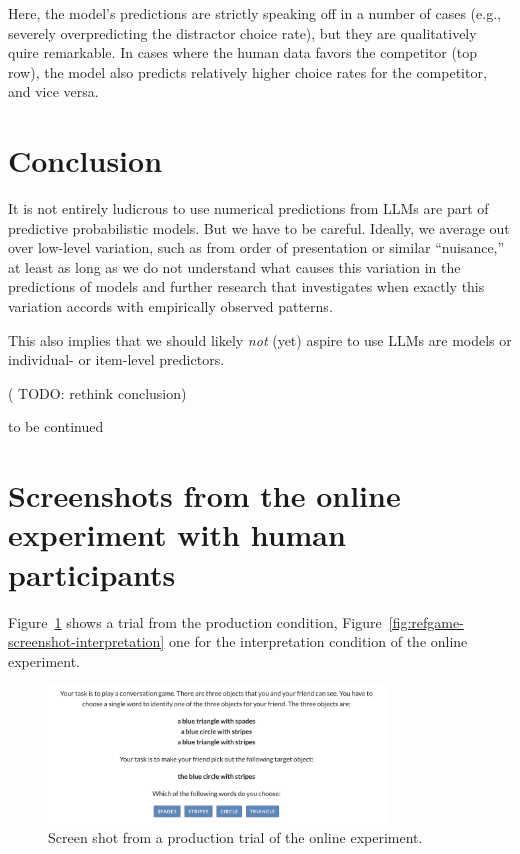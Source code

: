 \documentclass{article}
\begin{document}
Here, the model's predictions are strictly speaking off in a number of
cases (e.g., severely overpredicting the distractor choice rate), but
they are qualitatively quire remarkable. In cases where the human data
favors the competitor (top row), the model also predicts relatively
higher choice rates for the competitor, and vice versa.

\hypertarget{conclusion}{%
\section{Conclusion}\label{conclusion}}

It is not entirely ludicrous to use numerical predictions from LLMs are
part of predictive probabilistic models. But we have to be careful.
Ideally, we average out over low-level variation, such as from order of
presentation or similar ``nuisance,'' at least as long as we do not
understand what causes this variation in the predictions of models and
further research that investigates when exactly this variation accords
with empirically observed patterns.

This also implies that we should likely \emph{not} (yet) aspire to use
LLMs are models or individual- or item-level predictors.

( {TODO: rethink conclusion})

{to be continued}

\newpage
\appendix

\section{Screenshots from the online experiment with human participants}
\label{sec:scre-from-online}

Figure~\ref{fig:refgame-screenshot-production} shows a trial from the production condition, Figure~\ref{fig:refgame-screenshot-interpretation} one for the interpretation condition of the online experiment.

\begin{figure}[H]
  \centering
  \includegraphics[width = 0.8\textwidth]{00-pics/refgame-production.png}

  \caption{Screen shot from a production trial of the online experiment.}
  \label{fig:refgame-screenshot-production}
\end{figure}
\end{document}
